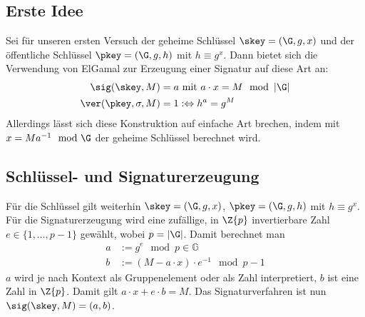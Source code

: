 \subsection{Erste Idee}
Sei für unseren ersten Versuch der geheime Schlüssel $\skey = (\G, g,
x)$ und der öffentliche Schlüssel $\pkey = (\G, g, h)$ mit $h \equiv g^{x}$. Dann bietet
sich die Verwendung von ElGamal zur Erzeugung einer Signatur auf diese
Art an: 
\begin{align*}
\sig(\skey,M) &= a \text{ mit } a \cdot x = M \mod \left|\G\right|\\
\ver(\pkey,\sigma,M) &= 1 :\Leftrightarrow h^a = g^M
\end{align*}
Allerdings lässt sich diese Konstruktion auf einfache Art brechen, indem
mit $x = M a^{-1} \mod \G$ der geheime Schlüssel berechnet wird. 

\subsection{Schlüssel- und Signaturerzeugung}
Für die Schlüssel gilt weiterhin $\skey = (\G, g,
x)$, $\pkey = (\G, g, h)$ mit $h \equiv g^{x}$. 
Für die Signaturerzeugung wird eine zufällige, in $\Z{p}$ invertierbare
Zahl $e \in \{1, \dots, p - 1\}$ gewählt,
wobei $p=|\G|$. Damit berechnet man 
\begin{align*}
a &:= g^e \mod p \in \mathbb{G}\\
b &:= (M - a \cdot x) \cdot e^{-1} \mod p-1
\end{align*}
$a$ wird je nach Kontext als Gruppenelement oder als Zahl interpretiert, $b$
ist eine Zahl in $\Z{p}$.  
Damit gilt $a \cdot x + e \cdot b = M$. Das Signaturverfahren ist nun
$\sig(\skey,M) = (a, b)$.

